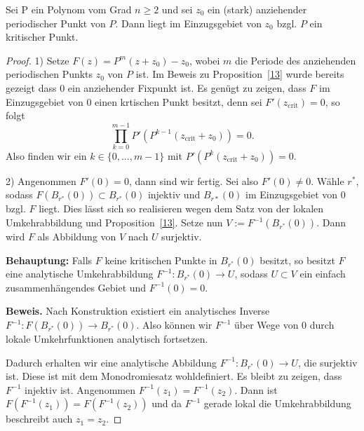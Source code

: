 \documentclass{mywork}
\begin{document}
\begin{thm} \label{last}
Sei P ein Polynom vom Grad $n\ge 2$ und sei $z_0$ ein (stark) anziehender periodischer Punkt von $P$. Dann liegt im Einzugsgebiet von $z_0$ bzgl. $P$ ein kritischer Punkt.
\end{thm}

\begin{proof}
1) Setze $F(z)=P^m(z+z_0)-z_0$, wobei $m$ die Periode des anziehenden periodischen Punkts $z_0$ von $P$ ist. Im Beweis zu Proposition~\ref{13} wurde bereits gezeigt dass $0$ ein anziehender Fixpunkt ist.  Es genügt zu zeigen, dass $F$ im Einzugsgebiet von $0$ einen krtischen Punkt besitzt, denn sei $F'(z_{\mathrm{crit}})=0$, so folgt
\[
	\prod_{k=0}^{m-1} P'(P^{k-1}(z_{\mathrm{crit}}+z_0))=0.
\]
Also finden wir ein $k\in \{0,...,m-1\}$ mit $P'(P^k(z_{\mathrm{crit}}+z_0))=0$.

2) Angenommen $F'(0)=0$, dann sind wir fertig. Sei also $F'(0)\neq 0$. Wähle $r^*$, sodass $F(B_{r^*}(0))\subset B_{r^*}(0)$ injektiv und $B_{r*}(0)$ im Einzugsgebiet von $0$ bzgl. $F$ liegt. Dies lässt sich so realisieren wegen dem Satz von der lokalen Umkehrabbildung und Proposition~\ref{13}. Setze nun $V:=F^{-1}(B_{r^*}(0))$. Dann wird $F$ als Abbildung von $V$ nach $U$ surjektiv.

\textbf{Behauptung:} Falls $F$ keine kritischen Punkte in $B_{r^*}(0)$ besitzt, so besitzt $F$ eine analytische Umkehrabbildung $F^{-1}: B_{r^*}(0) \to U$, sodass $U\subset V$ ein einfach zusammenhängendes Gebiet und $F^{-1}(0)=0$.

\textbf{Beweis.} Nach Konstruktion existiert ein analytisches Inverse $F^{-1}: F(B_{r^*}(0)) \to B_{r^*}(0)$. Also können wir $F^{-1}$ über Wege von $0$ durch lokale Umkehrfunktionen analytisch fortsetzen.

\begin{figure}[H]
\centering
{}
\end{figure}

Dadurch erhalten wir eine analytische Abbildung $F^{-1}: B_{r^*}(0) \to U$, die surjektiv ist. Diese ist mit dem Monodromiesatz wohldefiniert. Es bleibt zu zeigen, dass $F^{-1}$ injektiv ist. Angenommen $F^{-1}(z_1)=F^{-1}(z_2)$. Dann ist $F(F^{-1}(z_1))=F(F^{-1}(z_2))$ und da $F^{-1}$ gerade lokal die Umkehrabbildung beschreibt auch $z_1=z_2$.


\end{proof}
\end{document}
